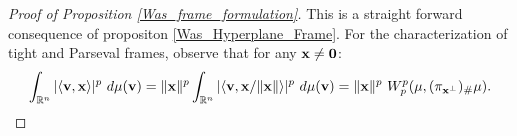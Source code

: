 \documentclass{amsart}
\numberwithin{equation}{section}
\newcommand\R{{\mathbb R}}
\newcommand\supp{{\operatorname{supp}}}
\theoremstyle{plain}
\theoremstyle{definition}
\begin{document}
\begin{proof}[Proof of Proposition \ref{Was_frame_formulation}]
This is a straight forward  consequence of propositon \ref{Was_Hyperplane_Frame}. For the characterization of tight and Parseval frames, observe that for any ${\bf x}\neq {\bf 0}  $:
$$  \int_{\R^n}|\langle {\bf v}, {\bf x} \rangle|^p\ d \mu({\bf v})= \|{\bf x} \|^p \int_{\R^n}|\langle {\bf v}, {\bf x}/ \|{\bf x} \| \rangle|^p\ d \mu({\bf v})=\|{\bf x} \|^p \ W^p_p(\mu, (\pi_{{\bf x}^{\perp}})_{\#}\mu).
$$
\end{proof}
\end{document}
